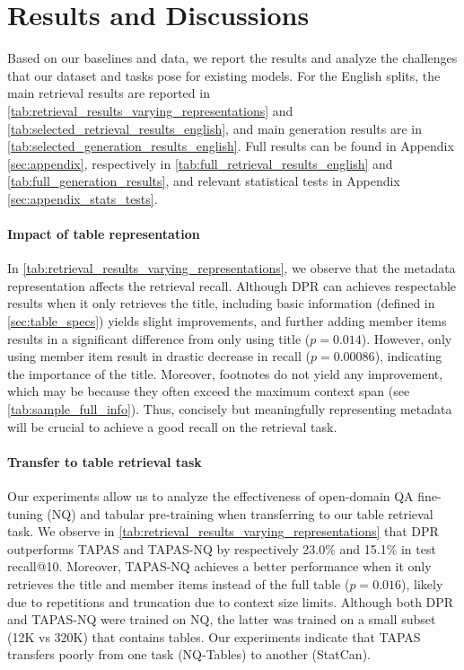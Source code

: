 \documentclass[11pt]{article}
\begin{document}
\section{Results and Discussions}
\label{sec:results_analysis}

Based on our baselines and data, we report the results and analyze the challenges that our dataset and tasks pose for existing models. For the English splits, the main retrieval results are reported in \autoref{tab:retrieval_results_varying_representations} and \autoref{tab:selected_retrieval_results_english}, and main generation results are in \autoref{tab:selected_generation_results_english}. Full results can be found in Appendix \ref{sec:appendix}, respectively in \autoref{tab:full_retrieval_results_english} and \autoref{tab:full_generation_results}, and relevant statistical tests in Appendix \ref{sec:appendix_stats_tests}.

\paragraph{Impact of table representation}
In \autoref{tab:retrieval_results_varying_representations}, we observe that the metadata representation affects the retrieval recall. Although DPR can achieves respectable results when it only retrieves the title, including basic information (defined in  \autoref{sec:table_specs}) yields slight improvements, and further adding member items results in a significant difference from only using title ($p=0.014$). However, only using member item result in drastic decrease in recall ($p=0.00086$), indicating the importance of the title. Moreover, footnotes do not yield any improvement, which may be because they often exceed the maximum context span (see \autoref{tab:sample_full_info}). Thus, concisely but meaningfully representing metadata will be crucial to achieve a good recall on the retrieval task.






\paragraph{Transfer to table retrieval task}
Our experiments allow us to analyze the effectiveness of open-domain QA  fine-tuning (NQ) and tabular pre-training when transferring to our table retrieval task. We observe in \autoref{tab:retrieval_results_varying_representations} that DPR outperforms TAPAS and TAPAS-NQ by respectively 23.0\% and 15.1\% in test recall@10. Moreover, TAPAS-NQ achieves a better performance when it only retrieves the title and member items instead of the full table ($p=0.016$), likely due to repetitions and truncation due to context size limits. Although both DPR and TAPAS-NQ were trained on NQ, the latter was trained on a small subset (12K vs 320K) that contains tables. Our experiments indicate that TAPAS transfers poorly from one task (NQ-Tables) to another (StatCan).
\end{document}
